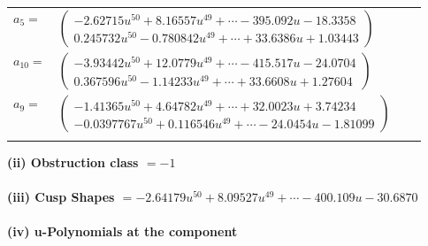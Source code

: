 \documentclass[1p]{elsarticle_modified}
\theoremstyle{definition}
\begin{document}
\begin{tabular}{m{7pt} m{180pt} m{7pt} m{180pt} }
\flushright $a_{5}=$&$\begin{pmatrix}-2.62715 u^{50}+8.16557 u^{49}+\cdots-395.092 u-18.3358\\0.245732 u^{50}-0.780842 u^{49}+\cdots+33.6386 u+1.03443\end{pmatrix}$ \\
\flushright $a_{10}=$&$\begin{pmatrix}-3.93442 u^{50}+12.0779 u^{49}+\cdots-415.517 u-24.0704\\0.367596 u^{50}-1.14233 u^{49}+\cdots+33.6608 u+1.27604\end{pmatrix}$ \\
\flushright $a_{9}=$&$\begin{pmatrix}-1.41365 u^{50}+4.64782 u^{49}+\cdots+32.0023 u+3.74234\\-0.0397767 u^{50}+0.116546 u^{49}+\cdots-24.0454 u-1.81099\end{pmatrix}$\\&\end{tabular}
\flushleft \textbf{(ii) Obstruction class $= -1$}\\~\\
\flushleft \textbf{(iii) Cusp Shapes $= -2.64179 u^{50}+8.09527 u^{49}+\cdots-400.109 u-30.6870$}\\~\\
\newpage\renewcommand{\arraystretch}{1}
\flushleft \textbf{(iv) u-Polynomials at the component}\newline \\
\end{document}
